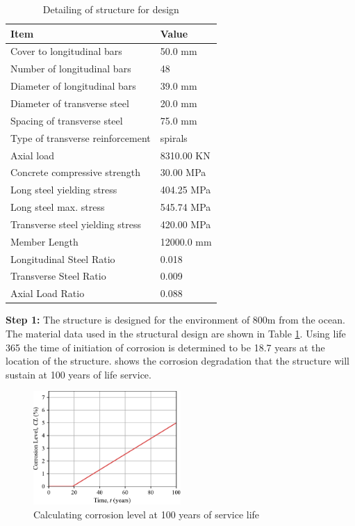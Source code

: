 \begin{table}[htpb]
\caption{Detailing of structure for design}
\label{tab:desing_example}
\begin{center}
\begin{tabular}{ll}
Item                             & Value      \\ \hline
Cover to longitudinal bars       & 50.0 mm    \\
Number of longitudinal bars      & 48         \\
Diameter of longitudinal bars    & 39.0 mm    \\
Diameter of transverse steel     & 20.0 mm    \\
Spacing of transverse steel      & 75.0 mm    \\
Type of transverse reinforcement  & spirals    \\
Axial load                       & 8310.00 KN \\
Concrete compressive strength    & 30.00 MPa  \\
Long steel yielding stress       & 404.25 MPa \\
Long steel max. stress           & 545.74 MPa \\
Transverse steel yielding stress & 420.00 MPa \\
Member Length                    & 12000.0 mm \\
Longitudinal Steel Ratio         & 0.018      \\
Transverse Steel Ratio           & 0.009      \\
Axial Load Ratio                 & 0.088     
\end{tabular}
\end{center}
\end{table}

\textbf{Step 1:} The structure is designed for the environment of 800m from the ocean. The material data used in the structural design are shown in Table \ref{tab:desing_example}. Using life 365 the time of initiation of corrosion is determined to be 18.7 years at the location of the structure.  shows the corrosion degradation that the structure will sustain at 100 years of life service. 
\begin{figure}[htbp]
	\centering
	\includegraphics[width=0.5\textwidth]{VAC Thesis 2.0/Chapter-6/figs/CorrosionLevel_lifeService_5.pdf}
	\caption{Calculating corrosion level at 100 years of service life}
	\label{fig:corrosion_level_100years}
\end{figure}

